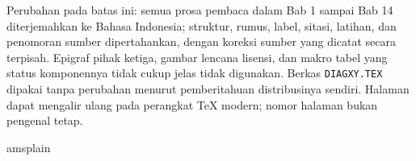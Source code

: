 \documentclass[11pt,reqno]{amsbook}
\theoremstyle{definition}
\theoremstyle{remark}
\numberwithin{equation}{section}
\begin{document}
Perubahan pada batas ini: semua prosa pembaca dalam Bab 1 sampai Bab 14
diterjemahkan ke Bahasa Indonesia; struktur, rumus, label, sitasi, latihan,
dan penomoran sumber dipertahankan, dengan koreksi sumber yang dicatat secara
terpisah. Epigraf pihak ketiga, gambar lencana lisensi, dan makro tabel yang
status komponennya tidak cukup jelas tidak digunakan. Berkas
\texttt{DIAGXY.TEX} dipakai tanpa perubahan menurut pemberitahuan distribusinya
sendiri. Halaman dapat
mengalir ulang pada perangkat TeX modern; nomor halaman bukan pengenal tetap.



\vfill\eject

\tableofcontents




\mainmatter




 
 
 
 
 
 
 
 
 
 
 
 
 
 






\backmatter


 \clearpage
  {amsplain}
 


 \cleardoublepage
 \printindex
\end{document}

